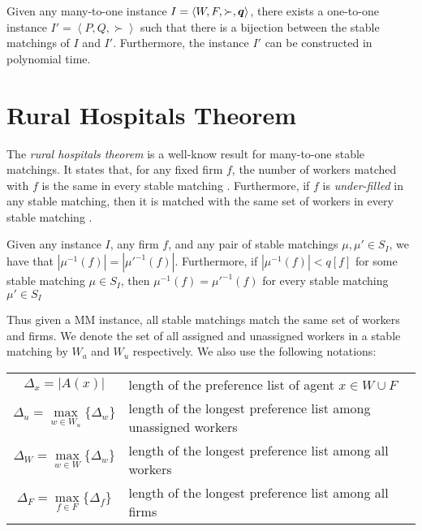 \begin{proposition}
  Given any many-to-one instance $I = \left< W, F, \succ, \boldsymbol{q} \right>$, there exists a one-to-one instance $I' = \left< P, Q, \succ \right>$ such that there is a bijection between the stable matchings of $I$ and $I'$. Furthermore, the instance $I'$ can be constructed in polynomial time.
\end{proposition}

\section{Rural Hospitals Theorem}

The \textit{rural hospitals theorem} is a well-know result for many-to-one stable matchings. It states that, for any fixed firm $f$, the number of workers matched with $f$ is the same in every stable matching \cite{roth1984evolution}. Furthermore, if $f$ is \textit{under-filled} in any stable matching, then it is matched with the same set of workers in every stable matching \cite{roth1986allocation}.

\begin{proposition}
  Given any instance $I$, any firm $f$, and any pair of stable matchings $\mu, \mu' \in S_I$, we have that $|\mu^{-1}(f)| = |\mu'^{-1}(f)|$. Furthermore, if $|\mu^{-1}(f)| < q[f]$ for some stable matching $\mu \in S_I$, then $\mu^{-1}(f) = \mu'^{-1}(f)$ for every stable matching $\mu' \in S_I$
\end{proposition}

Thus given a MM instance, all stable matchings match the same set of workers and firms. We denote the set of all assigned and unassigned workers in a stable matching by $W_a$ and $W_u$ respectively. We also use the following notations:

\begin{tabular}{c L{4in}}
  $\Delta_x = |A(x)|$                                 & length of the preference list of agent $x \in W \cup F$        \\
  $\Delta_u = \max\limits_{w \in W_u} \{ \Delta_w \}$ & length of the longest preference list among unassigned workers \\
  $\Delta_W = \max\limits_{w \in W} \{ \Delta_w \}$   & length of the longest preference list among all workers        \\
  $\Delta_F = \max\limits_{f \in F} \{ \Delta_f \}$   & length of the longest preference list among all firms
\end{tabular}